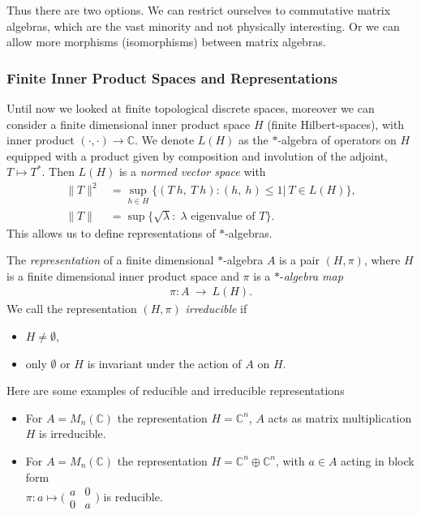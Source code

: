 Thus there are two options. We can restrict ourselves to commutative matrix algebras,
which are the vast minority and not physically interesting.
Or we can allow more morphisms (isomorphisms) between matrix algebras.

\subsubsection{Finite Inner Product Spaces and Representations}
Until now we looked at finite topological discrete spaces, moreover we can consider a
finite dimensional inner product space $H$ (finite Hilbert-spaces), with inner product
$(\cdot,\cdot)\rightarrow \mathbb{C}$. We denote $L(H)$ as  the $*$-algebra of operators on $H$
equipped with a product given by composition and involution of the adjoint, $T \mapsto T^*$.
Then $L(H)$ is a \textit{normed vector space} with
\begin{align}
    \|T\|^2 &= \sup_{h \in H}\big\{(T\ h,\ T\ h): (h,\ h) \leq 1\big|\ T
    \in L(H)\big \},\\
    \|T\| &= \sup\big\{\sqrt{\lambda}:\; \lambda \text{ eigenvalue of } T\big\}.
\end{align}
This allows us to define representations of $*$-algebras.
\begin{definition}
    The \textit{representation} of a finite dimensional $*$-algebra $A$ is a
    pair $(H, \pi)$, where $H$ is a finite dimensional inner product space
    and $\pi$ is a $*$-\textit{algebra map}
    \begin{align}
        \pi:A\ \rightarrow \ L(H).
    \end{align}
    We call the representation $(H, \pi)$ \textit{irreducible} if
    \begin{itemize}
        \item $H \neq \emptyset$,
        \item only $\emptyset$ or $H$ is invariant under the action of $A$ on
            $H$.
    \end{itemize}
\end{definition}
Here are some examples of reducible and irreducible representations
\begin{itemize}
    \item For $A = M_n(\mathbb{C})$ the representation $H=\mathbb{C}^n$, $A$ acts as matrix multiplication\\
            $H$ is irreducible.
    \item For $A = M_n(\mathbb{C})$ the representation $H=\mathbb{C}^n\oplus \mathbb{C}^n$, with $a \in A$ acting
        in block form \\ $\pi: a \mapsto \big(\begin{smallmatrix} a & 0\\ 0 & a \end{smallmatrix}\big)$ is
            reducible.
\end{itemize}

